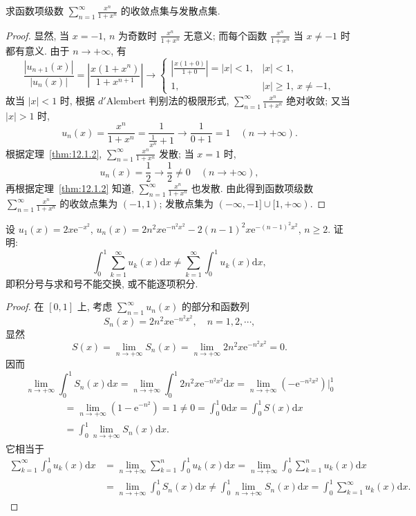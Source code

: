 \begin{example}\label{ex:13.1.3}
求函数项级数 $\sum_{n=1}^{\infty}\frac{x^{n}}{1+x^{n}}$ 的收敛点集与发散点集.
\end{example}

\begin{proof}
显然, 当 $x=-1$, $n$ 为奇数时 $\frac{x^{n}}{1+x^{n}}$ 无意义; 而每个函数 $\frac{x^{n}}{1+x^{n}}$ 当 $x\neq-1$ 时都有意义. 由于 $n\to+\infty$, 有
\[
  \frac{|u_{n+1}(x)|}{|u_{n}(x)|}=\left|\frac{x(1+x^{n})}{1+x^{n+1}}\right|\to\begin{cases}
    \left|\frac{x(1+0)}{1+0}\right|=|x|<1, & |x|<1,\\
    1, & |x|\geqslant1,\ x\neq-1,
\end{cases}
\]
故当 $|x|<1$ 时, 根据 $d'$Alembert 判别法的极限形式, $\sum_{n=1}^{\infty}\frac{x^{n}}{1+x^{n}}$ 绝对收敛; 又当 $|x|>1$ 时,
\[
  u_{n}(x)=\frac{x^{n}}{1+x^{n}}=\frac{1}{\frac{1}{x^{n}}+1}\to\frac{1}{0+1}=1\quad(n\to+\infty).
\]
根据定理~\ref{thm:12.1.2}, $\sum_{n=1}^{\infty}\frac{x^{n}}{1+x^{n}}$ 发散; 当 $x=1$ 时,
\[
  u_{n}(x)=\frac{1}{2}\to\frac{1}{2}\neq0\quad(n\to+\infty),
\]
再根据定理~\ref{thm:12.1.2} 知道, $\sum_{n=1}^{\infty}\frac{x^{n}}{1+x^{n}}$ 也发散. 由此得到函数项级数 $\sum_{n=1}^{\infty}\frac{x^{n}}{1+x^{n}}$ 的收敛点集为 $(-1,1)$; 发散点集为 $(-\infty,-1]\cup[1,+\infty)$.
\end{proof}

\begin{example}\label{ex:13.1.4}
设 $u_{1}(x)=2x\mathrm{e}^{-x^{2}}$, $u_{n}(x)=2n^{2}x\mathrm{e}^{-n^{2}x^{2}}-2(n-1)^{2}x\mathrm{e}^{-(n-1)^{2}x^{2}}$, $n\geqslant2$. 证明:
\[
  \int_{0}^{1}\sum_{k=1}^{\infty}u_{k}(x)\mathrm{d}x\neq\sum_{k=1}^{\infty}\int_{0}^{1}u_{k}(x)\mathrm{d}x,
\]
即积分号与求和号不能交换, 或不能逐项积分.
\end{example}

\begin{proof}
在 $[0,1]$ 上, 考虑 $\sum_{n=1}^{\infty}u_{n}(x)$ 的部分和函数列
\[
  S_{n}(x)=2n^{2}x\mathrm{e}^{-n^{2}x^{2}},\quad n=1,2,\cdots,
\]
显然
\[
  S(x)=\lim_{n\to+\infty}S_{n}(x)=\lim_{n\to+\infty}2n^{2}x\mathrm{e}^{-n^{2}x^{2}}=0.
\]
因而
\[
  \lim_{n\to+\infty}\int_{0}^{1}S_{n}(x)\mathrm{d}x=\lim_{n\to+\infty}\int_{0}^{1}2n^{2}x\mathrm{e}^{-n^{2}x^{2}}\mathrm{d}x=\lim_{n\to+\infty}\left(-\mathrm{e}^{-n^{2}x^{2}}\right)\Big|_{0}^{1}
\]
\[
  \begin{aligned}
    &=\lim_{n\to+\infty}(1-\mathrm{e}^{-n^{2}})=1\neq0=\int_{0}^{1}0\mathrm{d}x=\int_{0}^{1}S(x)\mathrm{d}x\\
    &=\int_{0}^{1}\lim_{n\to+\infty}S_{n}(x)\mathrm{d}x.
  \end{aligned}
\]
它相当于
\[
  \begin{aligned}
    \sum_{k=1}^{\infty}\int_{0}^{1}u_{k}(x)\mathrm{d}x&=\lim_{n\to+\infty}\sum_{k=1}^{n}\int_{0}^{1}u_{k}(x)\mathrm{d}x=\lim_{n\to+\infty}\int_{0}^{1}\sum_{k=1}^{n}u_{k}(x)\mathrm{d}x\\
    &=\lim_{n\to+\infty}\int_{0}^{1}S_{n}(x)\mathrm{d}x\neq\int_{0}^{1}\lim_{n\to+\infty}S_{n}(x)\mathrm{d}x=\int_{0}^{1}\sum_{k=1}^{\infty}u_{k}(x)\mathrm{d}x.
  \end{aligned}
\]
\end{proof}

